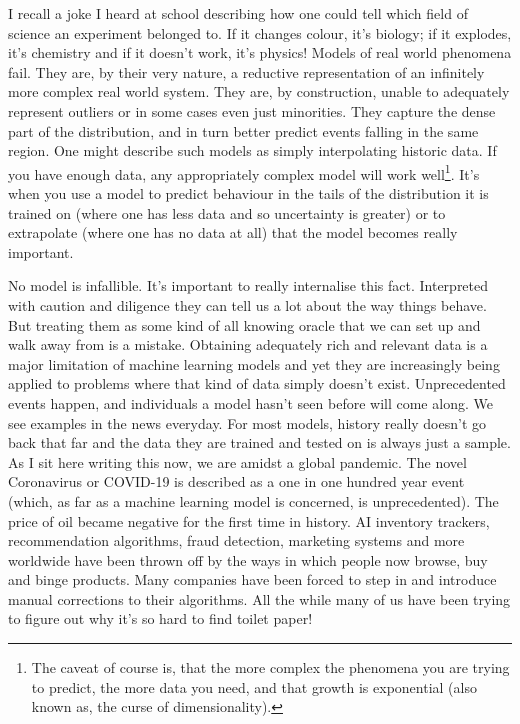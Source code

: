 I recall a joke I heard at school describing how one could tell which field of science an experiment belonged to. If it changes colour, it's biology; if it explodes, it's chemistry and if it doesn't work, it's physics! Models of real world phenomena fail. They are, by their very nature, a reductive representation of an infinitely more complex real world system. They are, by construction, unable to adequately represent outliers or in some cases even just minorities. They capture the dense part of the distribution, and in turn better predict events falling in the same region. One might describe such models as simply interpolating historic data. If you have enough data, any appropriately complex model will work well\footnote{The caveat of course is, that the more complex the phenomena you are trying to predict, the more data you need, and that growth is exponential (also known as, the curse of dimensionality).}. It's when you use a model to predict behaviour in the tails of the distribution it is trained on (where one has less data and so uncertainty is greater) or to extrapolate (where one has no data at all) that the model becomes really important.

No model is infallible. It's important to really internalise this fact. Interpreted with caution and diligence they can tell us a lot about the way things behave. But treating them as some kind of all knowing oracle that we can set up and walk away from is a mistake. Obtaining adequately rich and relevant data is a major limitation of machine learning models and yet they are increasingly being applied to problems where that kind of data simply doesn't exist. Unprecedented events happen, and individuals a model hasn't seen before will come along. We see examples in the news everyday. For most models, history really doesn't go back that far and the data they are trained and tested on is always just a sample. As I sit here writing this now, we are amidst a global pandemic. The novel Coronavirus or COVID-19 is described as a one in one hundred year event (which, as far as a machine learning model is concerned, is unprecedented). The price of oil became negative for the first time in history. AI inventory trackers, recommendation algorithms, fraud detection, marketing systems and more worldwide have been thrown off by the ways in which people now browse, buy and binge products. Many companies have been forced to step in and introduce manual corrections to their algorithms. All the while many of us have been trying to figure out why it's so hard to find toilet paper!

